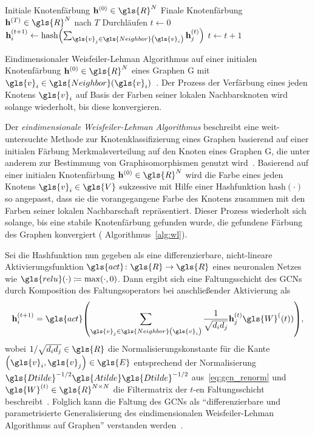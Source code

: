 \begin{algorithm}[t]
\centering
\begin{algorithmic}
  \REQUIRE{} Initiale Knotenfärbung $\ve{h}^{\left(0\right)} \in \gls{R}^N$
  \ENSURE{} Finale Knotenfärbung $\ve{h}^{\left(T\right)} \in \gls{R}^N$ nach $T$ Durchläufen
  \STATE{} $t \leftarrow 0$
  \REPEAT{}
      \STATE{} $\ve{h}^{\left(t+1\right)}_i \leftarrow \mathrm{hash}\left(\sum_{\gls{v}_j \in \gls{Neighbor}\left(\gls{v}_i\right)} \ve{h}^{\left(t\right)}_j\right)$
    \ENDFOR{}
    \STATE{} $t \leftarrow t + 1$
\end{algorithmic}
  \caption[Weisfeiler-Lehman Algorithmus]{Eindimensionaler Weisfeiler-Lehman Algorithmus auf einer initialen Knotenfärbung $\ve{h}^{\left(0\right)} \in \gls{R}^N$ eines Graphen \gls{G} mit $\gls{v}_i \in \gls{Neighbor}\left(\gls{v}_i\right)$~\cite{wl}. Der Prozess der Verfärbung eines jeden Knotens $\gls{v}_i$ auf Basis der Farben seiner lokalen Nachbarsknoten wird solange wiederholt, bis diese konvergieren.}
\label{alg:wl}
\end{algorithm}

Der \emph{eindimensionale Weis\-fei\-ler-Lehman Algorithmus} beschreibt eine weit-untersuchte Methode zur Knotenklassifizierung eines Graphen basierend auf einer initialen Färbung \bzw{} Merkmalsverteilung auf den Knoten eines Graphen \gls{G}, die unter anderem zur Bestimmung von Graphisomorphismen genutzt wird~\cite{douglas}.
Basierend auf einer initialen Knotenfärbung $\ve{h}^{\left(0\right)} \in \gls{R}^N$ wird die Farbe eines jeden Knotens $\gls{v}_i \in \gls{V}$ sukzessive mit Hilfe einer Hashfunktion $\mathrm{hash}\left(\cdot\right)$ so angepasst, dass sie die vorangegangene Farbe des Knotens zusammen mit den Farben seiner lokalen Nachbarschaft repräsentiert.
Dieser Prozess wiederholt sich solange, bis eine stabile Knotenfärbung gefunden wurde, \dhe{} die gefundene Färbung des Graphen konvergiert (\vgl{} Algorithmus~\ref{alg:wl}).

Sei die Hashfunktion nun gegeben als eine differenzierbare, nicht-lineare Aktivierungsfunktion $\gls{act} \colon \gls{R} \to \gls{R}$ eines neuronalen Netzes wie \zB{} $\gls{relu}\left(\cdot\right) \coloneqq \max\left(\cdot, 0\right)$.
Dann ergibt sich eine Faltungsschicht des \glspl{GCN} durch Komposition des Faltungsoperators bei anschließender Aktivierung als
\begin{equation*}
  \ve{h}^{\left(t+1\right)}_i = \gls{act}\left(\sum_{\gls{v}_j \in \gls{Neighbor}\left(\gls{v}_i\right)} \frac{1}{\sqrt{d_i d_j}} \ve{h}^{\left(t\right)}_j \gls{W}^(\left(t\right)) \right),
\end{equation*}
wobei $1/\sqrt{d_i d_j} \in \gls{R}$ die Normalisierungskonstante für die Kante $\left(\gls{v}_i, \gls{v}_j\right) \in \gls{E}$ entsprechend der Normalisierung $\gls{Dtilde}^{-1/2}\gls{Atilde}\gls{Dtilde}^{-1/2}$ aus~\eqref{eq:gcn_renorm} und $\gls{W}^{\left(t\right)} \in \gls{R}^{N \times N}$ die Filtermatrix der $t$-en Faltungsschicht beschreibt~\cite{gcn}.
Folglich kann die Faltung des \glspl{GCN} als \enquote{differenzierbare und parametrisierte Generalisierung des eindimensionalen Weisfeiler-Lehman Algorithmus auf Graphen} verstanden werden~\cite{gcn}.
